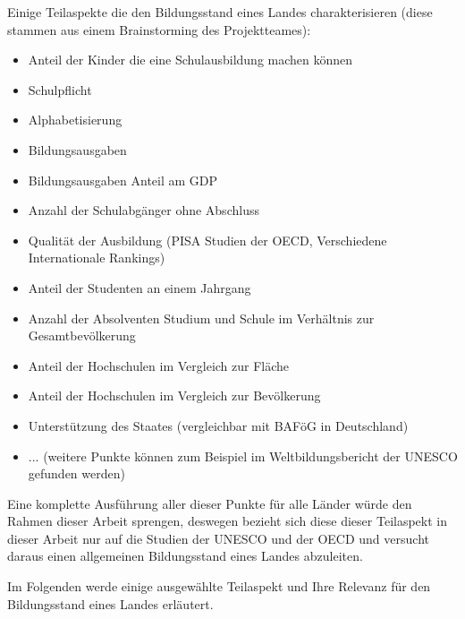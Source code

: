 Einige Teilaspekte die den Bildungsstand eines Landes charakterisieren (diese stammen aus einem Brainstorming des Projektteames):
\begin{itemize} 
\item Anteil der Kinder die eine Schulausbildung machen können
\item Schulpflicht
\item Alphabetisierung
\item Bildungsausgaben
\item Bildungsausgaben Anteil am GDP
\item Anzahl der Schulabgänger ohne Abschluss
\item Qualität der Ausbildung (PISA Studien der OECD, Verschiedene Internationale Rankings)
\item Anteil der Studenten an einem Jahrgang
\item Anzahl der Absolventen Studium und Schule im Verhältnis zur Gesamtbevölkerung
\item Anteil der Hochschulen im Vergleich zur Fläche
\item Anteil der Hochschulen im Vergleich zur Bevölkerung
\item Unterstützung des Staates (vergleichbar mit BAFöG in Deutschland)
\item ... (weitere Punkte können zum Beispiel im Weltbildungsbericht der UNESCO gefunden werden)
\end{itemize}
Eine komplette Ausführung aller dieser Punkte für alle Länder würde den Rahmen dieser Arbeit sprengen, deswegen bezieht sich diese
dieser Teilaspekt in dieser Arbeit nur auf die Studien der UNESCO und der OECD und versucht daraus einen allgemeinen Bildungsstand eines Landes abzuleiten.

Im Folgenden werde einige ausgewählte Teilaspekt und Ihre Relevanz für den Bildungsstand eines Landes erläutert.

